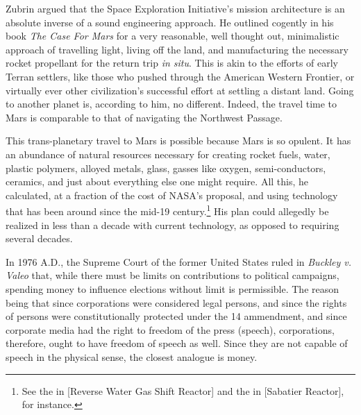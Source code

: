 Zubrin argued that the Space Exploration Initiative's mission architecture is an absolute inverse of a sound engineering approach. He outlined cogently in his book {\it The Case For Mars} for a very reasonable, well thought out, minimalistic approach of travelling light, living off the land, and manufacturing the necessary rocket propellant for the return trip {\it in situ}. This is akin to the efforts of early Terran settlers, like those who pushed through the American Western Frontier, or virtually ever other civilization's successful effort at settling a distant land. Going to another planet is, according to him, no different. Indeed, the travel time to Mars is comparable to that of navigating the Northwest Passage.

This trans-planetary travel to Mars is possible because Mars is so opulent. It has an abundance of natural resources necessary for creating rocket fuels, water, plastic polymers, alloyed metals, glass, gasses like oxygen, semi-conductors, ceramics, and just about everything else one might require. All this, he calculated, at a fraction of the cost of NASA's proposal, and using technology that has been around since the mid-19 century.\footnote{See the  in [Reverse Water Gas Shift Reactor] and the  in [Sabatier Reactor], for instance.} His plan could allegedly be realized in less than a decade with current technology, as opposed to requiring several decades.
\stopdefinition

In 1976 A.D., the Supreme Court of the former United States ruled in {\it Buckley v. Valeo} that, while there must be limits on contributions to political campaigns, spending money to influence elections without limit is permissible. The reason being that since corporations were considered legal persons, and since the rights of persons were constitutionally protected under the 14 ammendment, and since corporate media had the right to freedom of the press (speech), corporations, therefore, ought to have freedom of speech as well. Since they are not capable of speech in the physical sense, the closest analogue is money.
\stopdefinition

